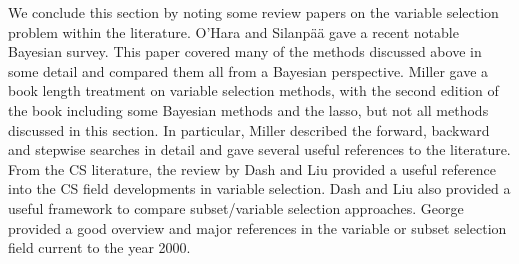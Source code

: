  We conclude this section by noting some review papers on the variable selection problem within the literature. O'Hara and Silanp\"{a}\"{a} \cite{o2009review} gave a recent notable Bayesian survey. This paper covered many of the methods discussed above in some detail and compared them all from a Bayesian perspective. Miller \cite{miller2002subset} gave a book length treatment on variable selection methods, with the second edition of the book including some Bayesian methods and the lasso, but not all methods discussed in this section. In particular, Miller \cite{miller2002subset} described the forward, backward and stepwise searches in detail and gave several useful references to the literature. From the CS literature, the review by Dash and Liu  \cite{dash1997feature} provided a useful reference into the CS field developments in variable selection. Dash and Liu \cite{dash1997feature} also provided a useful framework to compare subset/variable selection approaches. George \cite{george2000variable} provided a good overview and major references in the variable or subset selection field current to the year 2000.     

 \newpage
 